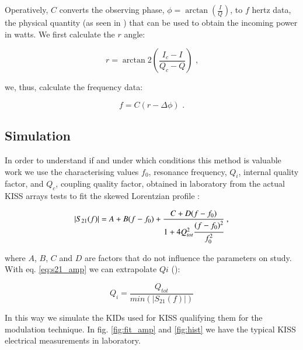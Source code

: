 \documentclass[twocolumn,traditabstract]{aa}\\
\begin{document}
\noindent Operatively, $C$ converts the observing phase, $\phi=\arctan\left( \frac{I}{Q} \right)$, to $f$ hertz data, the physical quantity (as seen in \cite{Swenson}) that can be used to obtain the incoming power in watts. We first calculate the $r$ angle:


\begin{equation}
r = \arctan2 \left( \frac{I_c - I}{Q_c - Q} \right)  \text{ ,}
\end{equation}

\noindent we, thus, calculate the frequency data:

\begin{equation}
f = C (r-\Delta\phi) \text{ .}
\end{equation}




\subsection{Simulation}

In order to understand if and under which conditions this method is valuable work we use the characterising values $f_0$, resonance frequency, $Q_i$, internal quality factor, and $Q_c$, coupling quality factor, obtained in laboratory from the actual KISS arrays tests to fit the skewed Lorentzian profile \cite{Gao}:

\begin{equation}
\left|S_{21}(f)\right|= A+B(f-f_0)+\frac{C+D(f-f_0)}{1+4Q_{tot}^2\cfrac{(f-f_0)^2}{f_0^2}} \text{ ,}
\label{eq:s21_amp}
\end{equation}

\noindent where $A$, $B$, $C$ and $D$ are factors that do not influence the parameters on study. With eq. \ref{eq:s21_amp} we can extrapolate $Qi$ (\cite{Gao}):

\begin{equation}
Q_i =\frac{Q_{tot}}{min(\left|S_{21}(f)\right|)}
\end{equation}

\noindent In this way we simulate the KIDs used for KISS qualifying them for the modulation technique. In fig. \ref{fig:fit_amp} and \ref{fig:hist} we have the typical KISS electrical measurements in laboratory.
\end{document}
